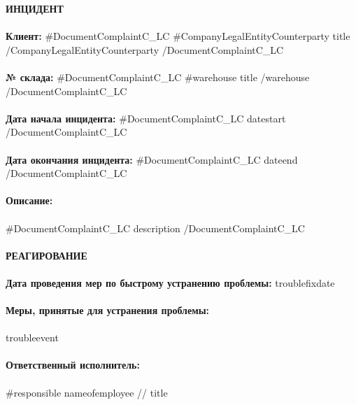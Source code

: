{{{{{{{\noindent \textbf{ИНЦИДЕНТ} \\
\vspace{1mm} \\
\textbf{Клиент:} {{#DocumentComplaintC_LC}} {{#CompanyLegalEntityCounterparty}} {{title}} {{/CompanyLegalEntityCounterparty}} {{/DocumentComplaintC_LC}}  \\
\vspace{1mm} \\
\textbf{№ склада:}  {{#DocumentComplaintC_LC}}  {{#warehouse}} {{title}} {{/warehouse}} {{/DocumentComplaintC_LC}}   \\
\vspace{1mm} \\
\textbf{Дата начала инцидента:} {{#DocumentComplaintC_LC}} {{datestart}}  {{/DocumentComplaintC_LC}}  \\
\vspace{1mm} \\
\textbf{Дата окончания инцидента:}  {{#DocumentComplaintC_LC}} {{dateend}}  {{/DocumentComplaintC_LC}}  \\
\vspace{1mm} \\
\textbf{Описание:} \\
\vspace{1mm} \\
{{#DocumentComplaintC_LC}} {{description}} {{/DocumentComplaintC_LC}}  \\
\vspace{7mm} \\
\noindent\textbf{РЕАГИРОВАНИЕ} \\
\vspace{1mm} \\
\noindent\textbf{Дата проведения мер по быстрому устранению проблемы:} {{troublefixdate}}  \\
\vspace{1mm} \\
\noindent\textbf{Меры, принятые для устранения проблемы:} \\
\vspace{1mm} \\
 {{troubleevent}} \\
 \vspace{1mm} \\
\noindent\textbf{Ответственный исполнитель:} \\
\vspace{1mm} \\
{{#responsible}}
 {{nameofemployee}} // {{title}}  \\
}}}}}}}
